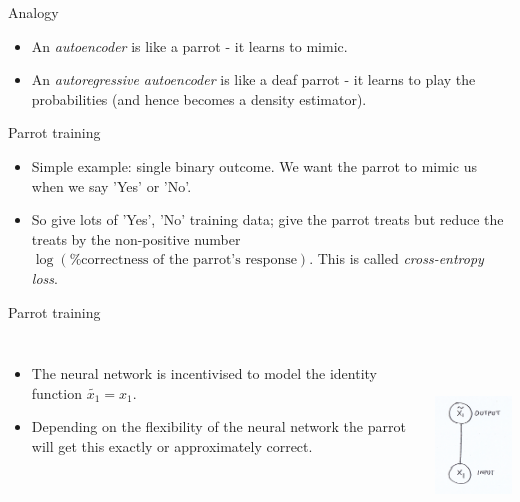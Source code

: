 \documentclass[usenames,dvipsnames]{beamer}
\begin{document}
\begin{frame}{Analogy}
  \begin{block}{}
    \begin{itemize}
      \item{An \textit{autoencoder} is like a parrot - it learns to mimic.}
	\item{An \textit{autoregressive autoencoder} is like a deaf parrot - it learns to play the probabilities (and hence becomes a density estimator).}
    \end{itemize}
  \end{block}
\end{frame}

\begin{frame}{Parrot training}
  \begin{block}{}
    \begin{itemize}
      \item{Simple example: single binary outcome. We want the parrot to mimic us when we say 'Yes' or 'No'.}
	\item{So give lots of 'Yes', 'No' training data; give the parrot treats but reduce the treats by the non-positive number $\log(\text{\% correctness of the parrot's response})$. This is called \textit{cross-entropy loss}.}
    \end{itemize}
  \end{block}
\end{frame}


\begin{frame}{Parrot training}
	\begin{columns}
    \begin{itemize}
      \item{The neural network is incentivised to model the identity function $\tilde{x_1} = x_1$.}
	\item{Depending on the flexibility of the neural network the parrot will get this exactly or approximately correct.}
    \end{itemize}
             \centering
             \includegraphics[height=5cm, width=3.5cm]{image_01}
         \end{columns} 
\end{frame}
\end{document}
